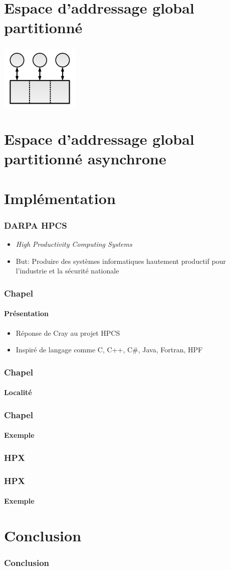 \documentclass{beamer}
\begin{document}
\section{Espace d'addressage global partitionné}
\begin{frame}
\frametitle{}
\begin{center}
\includegraphics[scale=3]{pgas.png}
\end{center}
\end{frame}

\section{Espace d'addressage global partitionné asynchrone}
\begin{frame}
\frametitle{}
\end{frame}

\section{Implémentation}
\begin{frame}
\frametitle{DARPA HPCS}
\begin{itemize}
\item \textit{High Productivity Computing Systems}
\item But: Produire des systèmes informatiques hautement productif pour l'industrie et la sécurité nationale
\end{itemize}
\end{frame}

\begin{frame}
\frametitle{Chapel}
\framesubtitle{Présentation}
\begin{itemize}
\item Réponse de Cray au projet HPCS
\item Inspiré de langage comme C, C++, C\#, Java, Fortran, HPF
\end{itemize}
\end{frame}

\begin{frame}
\frametitle{Chapel}
\framesubtitle{Localité}
\end{frame}

\begin{frame}
\frametitle{Chapel}
\framesubtitle{Exemple}
\end{frame}

\begin{frame}
\frametitle{HPX}
\end{frame}

\begin{frame}
\frametitle{HPX}
\framesubtitle{Exemple}
\end{frame}

\section{Conclusion}
\begin{frame}
\frametitle{Conclusion}
\end{frame}
\end{document}
